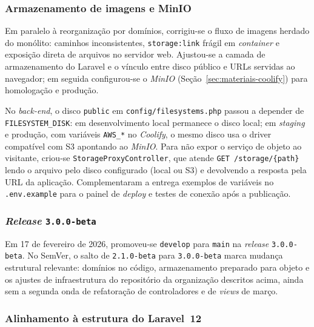 \subsubsection{Armazenamento de imagens e MinIO}\label{sec:dev-storage-minio}

Em paralelo à reorganização por domínios, corrigiu-se o fluxo de imagens herdado do monólito: caminhos inconsistentes, \texttt{storage:link} frágil em \textit{container} e exposição direta de arquivos no servidor web. Ajustou-se a camada de armazenamento do Laravel e o vínculo entre disco público e URLs servidas ao navegador; em seguida configurou-se o \textit{MinIO} (Seção~\ref{sec:materiais-coolify}) para homologação e produção.

No \textit{back-end}, o disco \texttt{public} em \texttt{config/filesystems.php} passou a depender de \texttt{FILESYSTEM\_DISK}: em desenvolvimento local permanece o disco local; em \textit{staging} e produção, com variáveis \texttt{AWS\_*} no \textit{Coolify}, o mesmo disco usa o driver compatível com S3 apontando ao \textit{MinIO}. Para não expor o serviço de objeto ao visitante, criou-se \texttt{StorageProxyController}, que atende \texttt{GET /storage/\{path\}} lendo o arquivo pelo disco configurado (local ou S3) e devolvendo a resposta pela URL da aplicação. Complementaram a entrega exemplos de variáveis no \texttt{.env.example} para o painel de \textit{deploy} e testes de conexão após a publicação.


\subsubsection{\textit{Release} \texttt{3.0.0-beta}}\label{sec:dev-release-300-beta}

Em 17 de fevereiro de 2026, promoveu-se \texttt{develop} para \texttt{main} na \textit{release} \texttt{3.0.0-beta}. No SemVer, o salto de \texttt{2.1.0-beta} para \texttt{3.0.0-beta} marca mudança estrutural relevante: domínios no código, armazenamento preparado para objeto e os ajustes de infraestrutura do repositório da organização descritos acima, ainda sem a segunda onda de refatoração de controladores e de \textit{views} de março.


\subsubsection{Alinhamento à estrutura do Laravel~12}\label{sec:dev-base-refactor}

